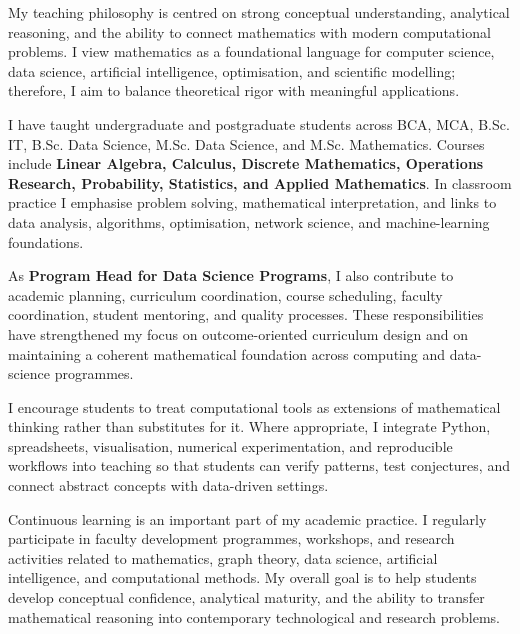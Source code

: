 
\begingroup
\setlength{\parindent}{0pt}
\setlength{\parskip}{6pt}
\sloppy

My teaching philosophy is centred on strong conceptual understanding, analytical reasoning, and the ability to connect mathematics with modern computational problems. I view mathematics as a foundational language for computer science, data science, artificial intelligence, optimisation, and scientific modelling; therefore, I aim to balance theoretical rigor with meaningful applications.

I have taught undergraduate and postgraduate students across BCA, MCA, B.Sc. IT, B.Sc. Data Science, M.Sc. Data Science, and M.Sc. Mathematics. Courses include \textbf{Linear Algebra, Calculus, Discrete Mathematics, Operations Research, Probability, Statistics, and Applied Mathematics}. In classroom practice I emphasise problem solving, mathematical interpretation, and links to data analysis, algorithms, optimisation, network science, and machine-learning foundations.

As \textbf{Program Head for Data Science Programs}, I also contribute to academic planning, curriculum coordination, course scheduling, faculty coordination, student mentoring, and quality processes. These responsibilities have strengthened my focus on outcome-oriented curriculum design and on maintaining a coherent mathematical foundation across computing and data-science programmes.

I encourage students to treat computational tools as extensions of mathematical thinking rather than substitutes for it. Where appropriate, I integrate Python, spreadsheets, visualisation, numerical experimentation, and reproducible workflows into teaching so that students can verify patterns, test conjectures, and connect abstract concepts with data-driven settings.

Continuous learning is an important part of my academic practice. I regularly participate in faculty development programmes, workshops, and research activities related to mathematics, graph theory, data science, artificial intelligence, and computational methods. My overall goal is to help students develop conceptual confidence, analytical maturity, and the ability to transfer mathematical reasoning into contemporary technological and research problems.

\endgroup
